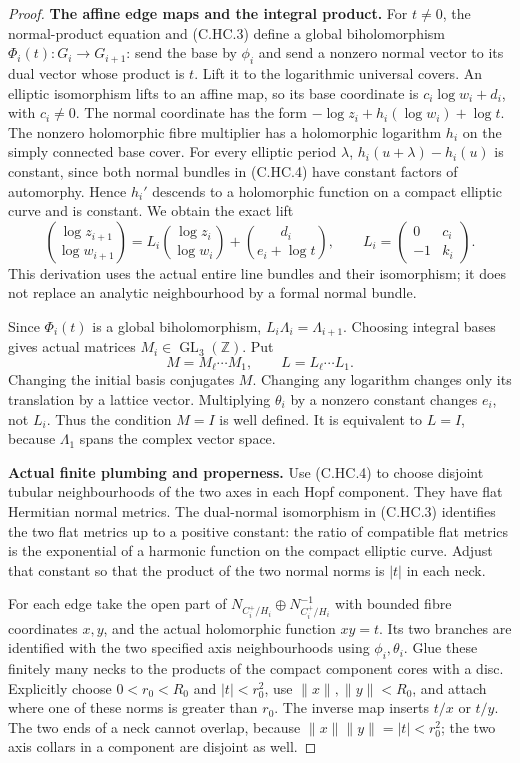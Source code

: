 \begin{proof}
\par\medskip\noindent\textbf{The affine edge maps and the integral product.}
For $t\ne0$, the normal-product equation and
(C.HC.3) define a global biholomorphism
$\Phi_i(t):G_i\to G_{i+1}$: send the base by $\phi_i$
and send a nonzero normal vector to its dual vector
whose product is $t$. Lift it to the logarithmic
universal covers. An elliptic isomorphism lifts to
an affine map, so its base coordinate is
$c_i\log w_i+d_i$, with $c_i\ne0$.
The normal coordinate has the form
$-\log z_i+h_i(\log w_i)+\log t$.
The nonzero holomorphic fibre multiplier has a
holomorphic logarithm $h_i$ on the simply connected
base cover. For every elliptic period $\lambda$,
$h_i(u+\lambda)-h_i(u)$ is constant, since both
normal bundles in (C.HC.4) have constant factors of
automorphy. Hence $h_i'$ descends to a holomorphic
function on a compact elliptic curve and is constant.
We obtain the exact lift
\[
 \binom{\log z_{i+1}}{\log w_{i+1}}
 =
 L_i\binom{\log z_i}{\log w_i}
 +\binom{d_i}{e_i+\log t},
 \qquad
 L_i=\begin{pmatrix}0&c_i\\-1&k_i\end{pmatrix}.
\tag{C.HC.5}
\]
This derivation uses the actual entire line bundles
and their isomorphism; it does not replace an
analytic neighbourhood by a formal normal bundle.

Since $\Phi_i(t)$ is a global biholomorphism,
$L_i\Lambda_i=\Lambda_{i+1}$. Choosing integral bases
gives actual matrices $M_i\in\operatorname{GL}_3(\mathbb Z)$.
Put
\[
 M=M_\ell\cdots M_1,\qquad L=L_\ell\cdots L_1.
\tag{C.HC.6}
\]
Changing the initial basis conjugates $M$.
Changing any logarithm changes only its translation
by a lattice vector. Multiplying $\theta_i$ by a
nonzero constant changes $e_i$, not $L_i$.
Thus the condition $M=I$ is well defined.
It is equivalent to $L=I$, because $\Lambda_1$
spans the complex vector space.

\par\medskip\noindent\textbf{Actual finite plumbing and properness.}
Use (C.HC.4) to choose disjoint tubular neighbourhoods
of the two axes in each Hopf component. They have
flat Hermitian normal metrics. The dual-normal
isomorphism in (C.HC.3) identifies the two flat
metrics up to a positive constant: the ratio of
compatible flat metrics is the exponential of a
harmonic function on the compact elliptic curve.
Adjust that constant so that the product of the
two normal norms is $|t|$ in each neck.

For each edge take the open part of
$N_{C_i^+/H_i}\oplus N_{C_i^+/H_i}^{-1}$
with bounded fibre coordinates $x,y$, and the
actual holomorphic function $xy=t$.
Its two branches are identified with the two
specified axis neighbourhoods using $\phi_i,\theta_i$.
Glue these finitely many necks to the products
of the compact component cores with a disc.
Explicitly choose $0<r_0<R_0$ and $|t|<r_0^2$,
use $\|x\|,\|y\|<R_0$, and attach where one of
these norms is greater than $r_0$.
The inverse map inserts $t/x$ or $t/y$.
The two ends of a neck cannot overlap, because
$\|x\|\|y\|=|t|<r_0^2$; the two axis collars in
a component are disjoint as well.


\end{proof}

